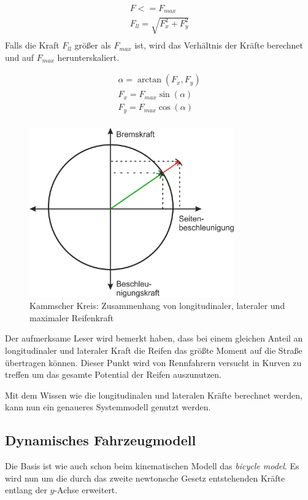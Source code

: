 \documentclass{like}
\begin{document}
\begin{eqnarray}
F <= F_{max} \\
F_{ll} = \sqrt{F_x^2 + F_y^2}  \\
\end{eqnarray}
Falls die Kraft $F_{ll}$ größer als $F_{max}$ ist, wird das Verhältnis der Kräfte berechnet und auf $F_{max}$ herunterskaliert.

\begin{eqnarray}
\alpha = \arctan(F_x, F_y)\\
F_x = F_{max} \sin(\alpha)\\
F_y = F_{max} \cos(\alpha)\\ 
\end{eqnarray}

\begin{figure}[ht!]
	\centering
	\includegraphics[width=250pt]{Abbildungen/kamKreis.png}
	\caption{Kammscher Kreis: Zusammenhang von longitudinaler, lateraler und maximaler Reifenkraft}
	\label{fig:kamKreis}
\end{figure}

Der aufmerksame Leser wird bemerkt haben, dass bei einem gleichen Anteil an longitudinaler und lateraler Kraft die Reifen das größte Moment auf die Straße übertragen können. Dieser Punkt wird von Rennfahrern versucht in Kurven zu treffen um das gesamte Potential der Reifen auszunutzen.


Mit dem Wissen wie die longitudinalen und lateralen Kräfte berechnet werden, kann nun ein genaueres Systemmodell genutzt werden.

\subsection{Dynamisches Fahrzeugmodell}
\label{dynModel}

Die Basis ist wie auch schon beim kinematischen Modell das \textit{bicycle model}. Es wird nun um die durch das zweite newtonsche Gesetz entstehenden Kräfte entlang der \(y\)-Achse erweitert.
\end{document}
